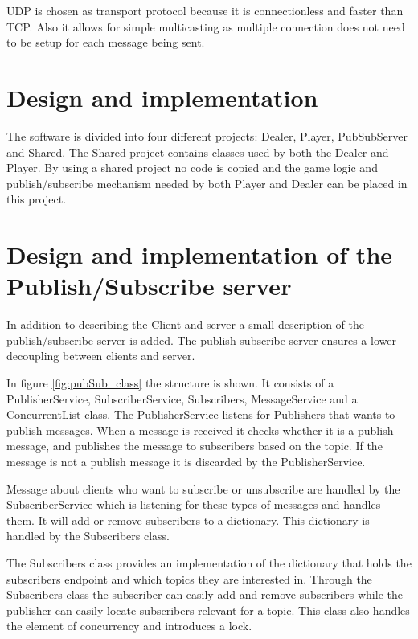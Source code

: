 
UDP is chosen as transport protocol because it is connectionless and faster than TCP. Also it allows for simple multicasting as multiple connection does not need to be setup for each message being sent.

\section{Design and implementation}
The software is divided into four different projects: Dealer, Player, PubSubServer and Shared. The Shared project contains classes used by both the Dealer and Player. By using a shared project no code is copied and the game logic and publish/subscribe mechanism needed by both Player and Dealer can be placed in this project.

\section{Design and implementation of the Publish/Subscribe server}
In addition to describing the Client and server a small description of the publish/subscribe server is added. The publish subscribe server ensures a lower decoupling between clients and server.


In figure \ref{fig:pubSub_class} the structure is shown. It consists of a PublisherService, SubscriberService, Subscribers, MessageService and a ConcurrentList class. The PublisherService listens for Publishers that wants to publish messages. When a message is received it checks whether it is a publish message, and publishes the message to subscribers based on the topic. If the message is not a publish message it is discarded by the PublisherService.

Message about clients who want to subscribe or unsubscribe are handled by the SubscriberService which is listening for these types of messages and handles them. It will add  or remove subscribers to a dictionary. This dictionary is handled by the Subscribers class.

The Subscribers class provides an implementation of the dictionary that holds the subscribers endpoint and which topics they are interested in. Through the Subscribers class the subscriber can easily add and remove subscribers while the publisher can easily locate subscribers relevant for a topic. This class also handles the element of concurrency and introduces a lock.

